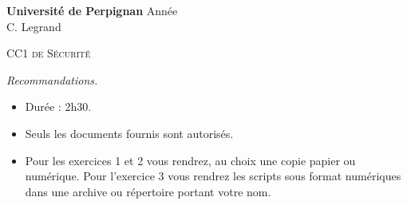 \documentclass[a4paper,9pt]{article}
\theoremstyle{plain}
\theoremstyle{definition}
\begin{document}
\hbox{}
\noindent \textbf{Université de Perpignan} \hfill  Année \the\year \\
 \hfill C. Legrand \\

\begin{center}
{  {\scshape \large CC1 de  S\'ecurit\'e}  \\
}



\end{center}
\hbox{}

\bigskip

\bigskip


\noindent\textit{Recommandations.}
\begin{itemize}
  \item Durée : 2h30. 
\item Seuls les documents fournis sont autorisés.
\item Pour les exercices 1 et 2 vous rendrez, au choix une copie papier ou numérique. Pour l'exercice 3 vous rendrez les scripts sous format numériques dans une archive ou répertoire portant votre nom. 
\end{itemize}
\end{document}
